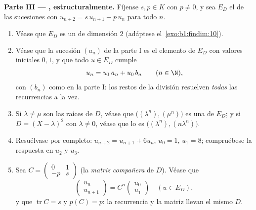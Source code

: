 \begin{problem}
\medskip
\noindent\textbf{Parte III --- ,
estructuralmente.} Fíjense $s, p \in K$ con $p \neq 0$, y sea $E_D$
el  de las sucesiones con
$u_{n+2} = s\,u_{n+1} - p\,u_n$ para todo $n$.
\begin{enumerate}[resume]
  \item Véase que $E_D$ es un  de dimensión $2$
        (adáptese el~\cref{exo:b1:findim:10}).
  \item Véase que la sucesión $(a_n)$ de la parte I es el elemento
        de $E_D$ con valores iniciales $0, 1$, y que todo
        $u \in E_D$ cumple
        \[
        u_n = u_1\,a_n + u_0\,b_n \qquad (n \in \N),
        \]
        con $(b_n)$ como en la parte I: los restos de la división
        resuelven \emph{todas} las recurrencias a la vez.
  \item Si $\lambda \neq \mu$ son las raíces de $D$, véase que
        $\bigl((\lambda^n), (\mu^n)\bigr)$ es una  de $E_D$; y
        si $D = (X-\lambda)^2$ con $\lambda \neq 0$, véase que lo es
        $\bigl((\lambda^n), (n\lambda^n)\bigr)$.
  \item Resuélvase por completo: $u_{n+2} = u_{n+1} + 6u_n$,
        $u_0 = 1$, $u_1 = 8$; compruébese la respuesta en $u_2$ y
        $u_3$.
  \item Sea $C = \begin{pmatrix} 0 & 1\\ -p & s\end{pmatrix}$ (la
        \emph{matriz compañera} de $D$). Véase que
        \[
        \begin{pmatrix} u_{n}\\ u_{n+1}\end{pmatrix}
        = C^n \begin{pmatrix} u_0\\ u_1\end{pmatrix}
        \quad (u \in E_D),
        \]
        y que $\operatorname{tr} C = s$ y $p(C) = p$: la recurrencia y
        la matriz llevan el mismo  $D$.
\end{enumerate}


\end{problem}
